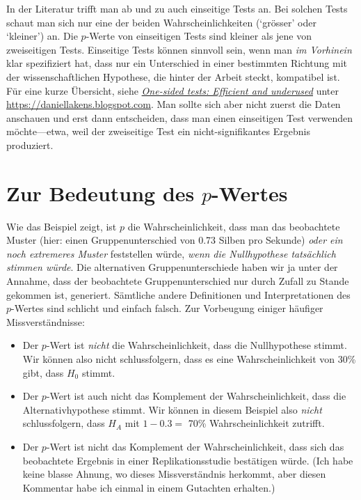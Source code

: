 \documentclass[oneside, 10pt]{book}\usepackage[]{graphicx}\usepackage[]{xcolor}
\begin{document}
In der Literatur trifft man ab und zu auch einseitige Tests an. Bei solchen Tests schaut man
sich nur eine der beiden Wahrscheinlichkeiten (`grösser' oder `kleiner') an. Die $p$-Werte
von einseitigen Tests sind kleiner als jene von zweiseitigen Tests. Einseitige Tests
können sinnvoll sein, wenn man \emph{im Vorhinein} klar spezifiziert hat, dass nur ein Unterschied
in einer bestimmten Richtung mit der wissenschaftlichen Hypothese, die hinter
der Arbeit steckt, kompatibel ist. Für eine kurze Übersicht, siehe \href{https://daniellakens.blogspot.com/2016/03/one-sided-tests-efficient-and-underused.html}{\textit{One-sided tests: Efficient and underused}} unter \url{https://daniellakens.blogspot.com}.
Man sollte sich aber nicht zuerst die Daten anschauen und erst dann
 entscheiden, dass man einen einseitigen Test verwenden möchte---etwa, weil der
 zweiseitige Test ein nicht-signifikantes Ergebnis produziert.

\section{Zur Bedeutung des $p$-Wertes}
Wie das Beispiel zeigt, ist $p$ die Wahrscheinlichkeit,
dass man das beobachtete Muster (hier: einen Gruppenunterschied von
0.73 Silben pro Sekunde) \emph{oder ein noch extremeres Muster} feststellen
würde, \emph{wenn die Nullhypothese tatsächlich stimmen würde}.
Die alternativen Gruppenunterschiede haben wir ja unter der Annahme,
dass der beobachtete Gruppenunterschied nur durch Zufall zu Stande gekommen ist, generiert.
Sämtliche andere Definitionen und Interpretationen
des $p$-Wertes sind schlicht und einfach falsch.
Zur Vorbeugung einiger häufiger Missverständnisse:

\begin{itemize}
 \item Der $p$-Wert ist \emph{nicht} die Wahrscheinlichkeit, dass die Nullhypothese
 stimmt. Wir können also nicht schlussfolgern, dass es eine Wahrscheinlichkeit von
 30\% gibt, dass $H_0$ stimmt.

 \item Der $p$-Wert ist auch nicht das Komplement der Wahrscheinlichkeit, dass die
  Alternativhypothese stimmt. Wir können in diesem Beispiel also \emph{nicht}
  schlussfolgern, dass $H_A$ mit $1 - 0.3 = $ 70\% Wahrscheinlichkeit zutrifft.

  \item Der $p$-Wert ist nicht das Komplement der Wahrscheinlichkeit, dass sich das beobachtete
  Ergebnis in einer Replikationsstudie bestätigen würde. (Ich habe keine
  blasse Ahnung, wo dieses Missverständnis herkommt, aber diesen Kommentar habe ich
  einmal in einem Gutachten erhalten.)
\end{itemize}
\end{document}
